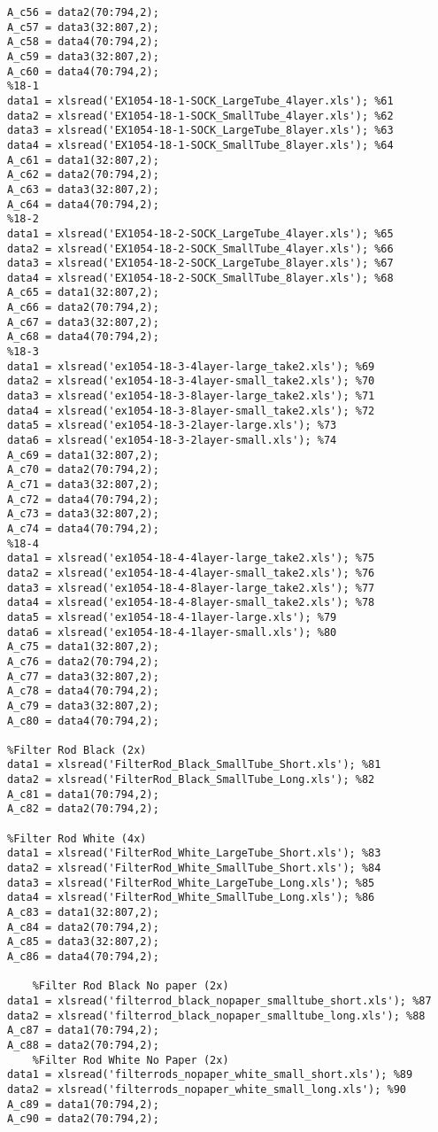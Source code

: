 \begin{verbatim}
A_c56 = data2(70:794,2);
A_c57 = data3(32:807,2);
A_c58 = data4(70:794,2);
A_c59 = data3(32:807,2);
A_c60 = data4(70:794,2);
%18-1
data1 = xlsread('EX1054-18-1-SOCK_LargeTube_4layer.xls'); %61
data2 = xlsread('EX1054-18-1-SOCK_SmallTube_4layer.xls'); %62
data3 = xlsread('EX1054-18-1-SOCK_LargeTube_8layer.xls'); %63
data4 = xlsread('EX1054-18-1-SOCK_SmallTube_8layer.xls'); %64
A_c61 = data1(32:807,2);
A_c62 = data2(70:794,2);
A_c63 = data3(32:807,2);
A_c64 = data4(70:794,2);
%18-2
data1 = xlsread('EX1054-18-2-SOCK_LargeTube_4layer.xls'); %65
data2 = xlsread('EX1054-18-2-SOCK_SmallTube_4layer.xls'); %66
data3 = xlsread('EX1054-18-2-SOCK_LargeTube_8layer.xls'); %67
data4 = xlsread('EX1054-18-2-SOCK_SmallTube_8layer.xls'); %68
A_c65 = data1(32:807,2);
A_c66 = data2(70:794,2);
A_c67 = data3(32:807,2);
A_c68 = data4(70:794,2);
%18-3
data1 = xlsread('ex1054-18-3-4layer-large_take2.xls'); %69
data2 = xlsread('ex1054-18-3-4layer-small_take2.xls'); %70
data3 = xlsread('ex1054-18-3-8layer-large_take2.xls'); %71
data4 = xlsread('ex1054-18-3-8layer-small_take2.xls'); %72
data5 = xlsread('ex1054-18-3-2layer-large.xls'); %73
data6 = xlsread('ex1054-18-3-2layer-small.xls'); %74
A_c69 = data1(32:807,2);
A_c70 = data2(70:794,2);
A_c71 = data3(32:807,2);
A_c72 = data4(70:794,2);
A_c73 = data3(32:807,2);
A_c74 = data4(70:794,2);
%18-4
data1 = xlsread('ex1054-18-4-4layer-large_take2.xls'); %75
data2 = xlsread('ex1054-18-4-4layer-small_take2.xls'); %76
data3 = xlsread('ex1054-18-4-8layer-large_take2.xls'); %77
data4 = xlsread('ex1054-18-4-8layer-small_take2.xls'); %78
data5 = xlsread('ex1054-18-4-1layer-large.xls'); %79
data6 = xlsread('ex1054-18-4-1layer-small.xls'); %80
A_c75 = data1(32:807,2);
A_c76 = data2(70:794,2);
A_c77 = data3(32:807,2);
A_c78 = data4(70:794,2);
A_c79 = data3(32:807,2);
A_c80 = data4(70:794,2);

%Filter Rod Black (2x)
data1 = xlsread('FilterRod_Black_SmallTube_Short.xls'); %81
data2 = xlsread('FilterRod_Black_SmallTube_Long.xls'); %82
A_c81 = data1(70:794,2);
A_c82 = data2(70:794,2);
    
%Filter Rod White (4x)
data1 = xlsread('FilterRod_White_LargeTube_Short.xls'); %83
data2 = xlsread('FilterRod_White_SmallTube_Short.xls'); %84
data3 = xlsread('FilterRod_White_LargeTube_Long.xls'); %85
data4 = xlsread('FilterRod_White_SmallTube_Long.xls'); %86
A_c83 = data1(32:807,2);
A_c84 = data2(70:794,2);
A_c85 = data3(32:807,2);
A_c86 = data4(70:794,2);
    
    %Filter Rod Black No paper (2x)
data1 = xlsread('filterrod_black_nopaper_smalltube_short.xls'); %87
data2 = xlsread('filterrod_black_nopaper_smalltube_long.xls'); %88
A_c87 = data1(70:794,2);
A_c88 = data2(70:794,2);
    %Filter Rod White No Paper (2x)
data1 = xlsread('filterrods_nopaper_white_small_short.xls'); %89
data2 = xlsread('filterrods_nopaper_white_small_long.xls'); %90
A_c89 = data1(70:794,2);
A_c90 = data2(70:794,2);
    

\end{verbatim}

